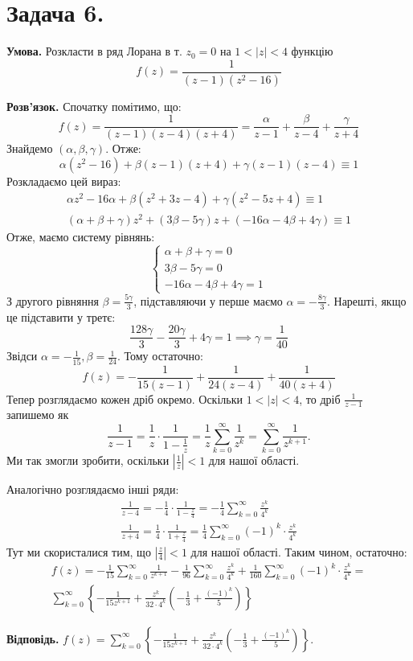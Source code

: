 \documentclass[14pt]{extarticle}
\begin{document}
\pagebreak

\section*{Задача 6.} 

\textbf{Умова.} Розкласти в ряд Лорана в т. $z_0=0$ на $1<|z|<4$ функцію
\[
f(z) = \frac{1}{(z-1)(z^2-16)}
\]

\textbf{Розв'язок.} Спочатку помітимо, що:
\[
f(z) = \frac{1}{(z-1)(z-4)(z+4)} = \frac{\alpha}{z-1} + \frac{\beta}{z-4} + \frac{\gamma}{z+4}
\]
Знайдемо $(\alpha,\beta,\gamma)$. Отже:
\[
\alpha(z^2-16)+\beta(z-1)(z+4)+\gamma(z-1)(z-4) \equiv 1
\]
Розкладаємо цей вираз:
\begin{gather*}
\alpha z^2 - 16\alpha + \beta(z^2+3z-4)+\gamma(z^2-5z+4) \equiv 1 \\
(\alpha+\beta+\gamma)z^2 + (3\beta-5\gamma)z + (-16\alpha-4\beta+4\gamma) \equiv 1
\end{gather*}
Отже, маємо систему рівнянь:
\[
\begin{cases}
    \alpha+\beta+\gamma = 0 \\
    3\beta-5\gamma = 0 \\
    -16\alpha-4\beta+4\gamma = 1
\end{cases}
\]
З другого рівняння $\beta=\frac{5\gamma}{3}$, підставляючи у перше маємо $\alpha = -\frac{8\gamma}{3}$. Нарешті, якщо це підставити у третє:
\[
\frac{128\gamma}{3} - \frac{20\gamma}{3} + 4\gamma = 1 \implies \gamma = \frac{1}{40}
\]
Звідси $\alpha=-\frac{1}{15},\beta=\frac{1}{24}$. Тому остаточно:
\[
f(z) = -\frac{1}{15(z-1)} + \frac{1}{24(z-4)} + \frac{1}{40(z+4)}
\]
Тепер розглядаємо кожен дріб окремо. Оскільки $1<|z|<4$, то дріб $\frac{1}{z-1}$ запишемо як
\[
\frac{1}{z-1} = \frac{1}{z} \cdot \frac{1}{1-\frac{1}{z}} = \frac{1}{z}\sum_{k=0}^{\infty} \frac{1}{z^k} = \sum_{k=0}^{\infty} \frac{1}{z^{k+1}}.
\]
Ми так змогли зробити, оскільки $\left|\frac{1}{z}\right| < 1$ для нашої області. 

Аналогічно розглядаємо інші ряди:
\begin{gather*}
\frac{1}{z-4} = -\frac{1}{4} \cdot \frac{1}{1-\frac{z}{4}} = -\frac{1}{4}\sum_{k=0}^{\infty} \frac{z^k}{4^k} \\
\frac{1}{z+4} = \frac{1}{4} \cdot \frac{1}{1+\frac{z}{4}} = \frac{1}{4} \sum_{k=0}^{\infty} (-1)^k \cdot \frac{z^k}{4^k}
\end{gather*}
Тут ми скористалися тим, що $\left|\frac{z}{4}\right|<1$ для нашої області. Таким чином, остаточно:
\begin{gather*}
f(z) = -\frac{1}{15}\sum_{k=0}^{\infty} \frac{1}{z^{k+1}} - \frac{1}{96}\sum_{k=0}^{\infty} \frac{z^k}{4^k} + \frac{1}{160}\sum_{k=0}^{\infty} (-1)^k \cdot \frac{z^k}{4^k} = \\
\boxed{\sum_{k=0}^{\infty}\left\{ -\frac{1}{15z^{k+1}} + \frac{z^k}{32 \cdot 4^k}\left(-\frac{1}{3} + \frac{(-1)^k}{5}\right) \right\}}
\end{gather*}

\textbf{Відповідь.} $f(z) = \sum_{k=0}^{\infty}\left\{ -\frac{1}{15z^{k+1}} + \frac{z^k}{32 \cdot 4^k}\left(-\frac{1}{3} + \frac{(-1)^k}{5}\right) \right\}$.

\pagebreak
\end{document}

